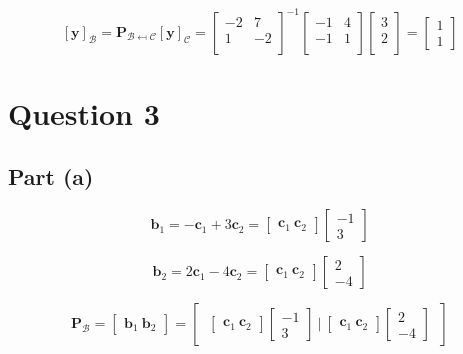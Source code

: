 \documentclass{article}
\begin{document}
\[%
    [\mathbf{y}]_{\mathcal{B}} 
    =
    \mathbf{P}_{\mathcal{B}\mapsfrom \mathcal{C}}
    [\mathbf{y}]_{\mathcal{C}}
    =
    \begin{bmatrix} -2 & 7 \\ 1 & -2 \\ \end{bmatrix}^{-1}
    \begin{bmatrix} -1 & 4 \\ -1 & 1 \\\end{bmatrix}
    \begin{bmatrix} 3 \\ 2\\ \end{bmatrix}
    =
    \begin{bmatrix} 1\\1 \end{bmatrix}
\]%

\clearpage
\section{Question 3} 
\subsection{Part (a)} 
\[%
    \mathbf{b}_{1} 
    =
    -\mathbf{c}_{1} + 3 \mathbf{c}_{2} 
    = 
    \begin{bmatrix} \mathbf{c}_{1} \ \mathbf{c}_{2}\end{bmatrix}
    \begin{bmatrix} -1 \\ 3  \end{bmatrix}
\]%

\[%
    \mathbf{b}_{2} = 2 \mathbf{c}_{1} - 4 \mathbf{c}_{2}
    =
    \begin{bmatrix} \mathbf{c}_{1} \ \mathbf{c}_{2}\end{bmatrix}
    \begin{bmatrix} 2 \\ -4 \end{bmatrix}
\]%

\[%
    \mathbf{P}_{\mathcal{B}} 
    =
    \begin{bmatrix} \mathbf{b}_{1} \ \mathbf{b}_{2} \end{bmatrix} 
    =
    \begin{bmatrix} \
    \begin{bmatrix} \mathbf{c}_{1} \ \mathbf{c}_{2}\end{bmatrix}
    \begin{bmatrix} -1 \\ 3  \end{bmatrix}
    \ \bigg| \
    \begin{bmatrix} \mathbf{c}_{1} \ \mathbf{c}_{2}\end{bmatrix}
    \begin{bmatrix} 2 \\ -4 \end{bmatrix}
    \
    \end{bmatrix}
\]%
\end{document}
